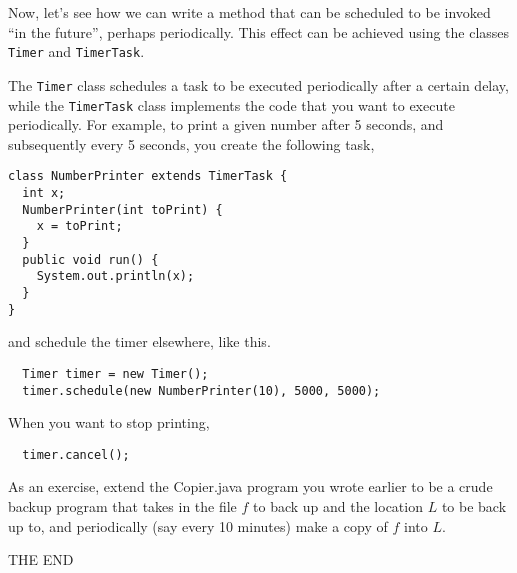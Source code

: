 \documentclass[a4paper,11pt]{exam}
\begin{document}
Now, let's see how we can write a method that can be scheduled to be invoked ``in the future'', perhaps periodically.  This effect can be achieved using the classes \texttt{Timer} and \texttt{TimerTask}.

The \texttt{Timer} class schedules a task to be executed periodically after a certain delay, while the \texttt{TimerTask} class implements the code that you want to execute periodically.  For example, to print a given number after 5 seconds, and subsequently every 5 seconds, you create the following task, 

\begin{verbatim}
class NumberPrinter extends TimerTask {
  int x;
  NumberPrinter(int toPrint) {
    x = toPrint;
  } 
  public void run() {
    System.out.println(x);
  }
}
\end{verbatim}
and schedule the timer elsewhere, like this.
\begin{verbatim}
  Timer timer = new Timer();
  timer.schedule(new NumberPrinter(10), 5000, 5000);
\end{verbatim}
When you want to stop printing,
\begin{verbatim}
  timer.cancel();
\end{verbatim}

As an exercise, extend the Copier.java program you wrote earlier to be a crude backup program that takes in the file $f$ to back up and the location $L$ to be back up to, and periodically (say every 10 minutes) make a copy of $f$ into $L$.

\vfill
\center\Huge{THE END}
\end{document}
